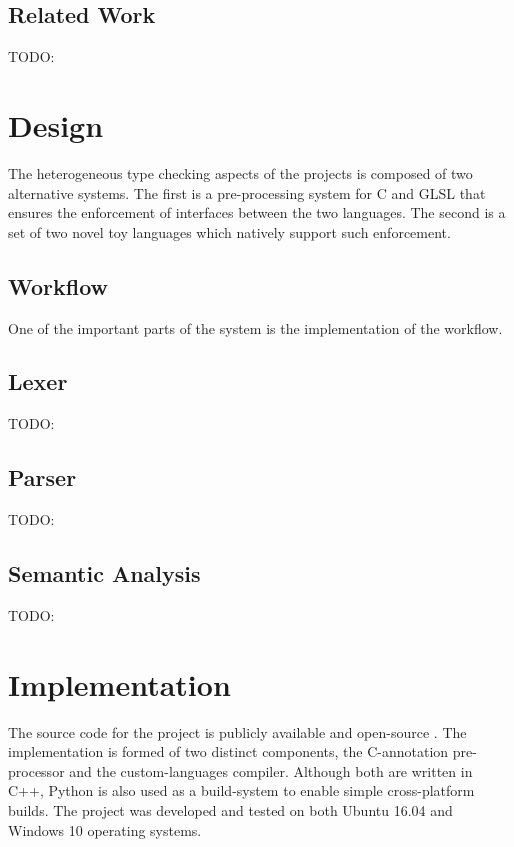 \documentclass[a4paper,12pt,twoside,openright]{report}
\begin{document}
\section{Related Work}

\label{sec:related_work}

TODO:

\chapter{Design}

The heterogeneous type checking aspects of the projects is composed of two
alternative systems. The first is a pre-processing system for C and GLSL that
ensures the enforcement of interfaces between the two languages. The second is
a set of two novel toy languages which natively support such enforcement.

\section{Workflow}

One of the important parts of the system is the implementation of the workflow.

\section{Lexer}

TODO:

\section{Parser}

TODO:

\section{Semantic Analysis}

TODO:

\chapter{Implementation}


The source code for the project is publicly available and open-source
\cite{ProjectSource}. The implementation is formed of two distinct components,
the C-annotation pre-processor and the custom-languages compiler. Although both
are written in C++, Python is also used as a build-system to enable simple
cross-platform builds. The project was developed and tested on both Ubuntu
16.04 and Windows 10 operating systems.
\end{document}
